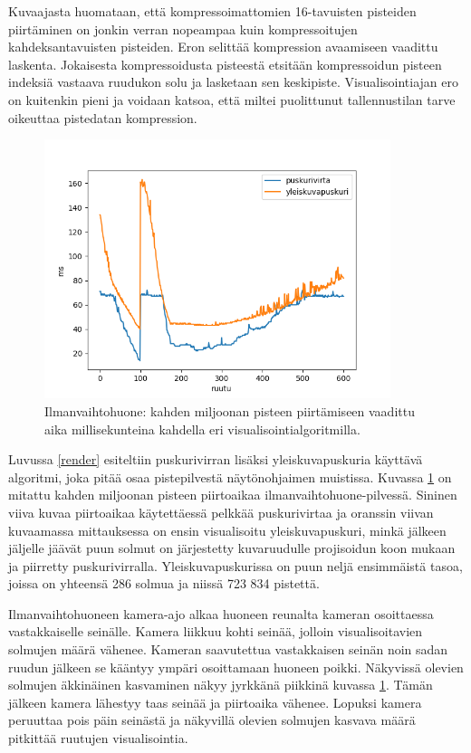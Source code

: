 Kuvaajasta huomataan, että kompressoimattomien 16-tavuisten pisteiden piirtäminen on jonkin verran nopeampaa kuin kompressoitujen kahdeksantavuisten pisteiden. Eron selittää kompression avaamiseen vaadittu laskenta. Jokaisesta kompressoidusta pisteestä etsitään kompressoidun pisteen indeksiä vastaava ruudukon solu ja lasketaan sen keskipiste. Visualisointiajan ero on kuitenkin pieni ja voidaan katsoa, että miltei puolittunut tallennustilan tarve oikeuttaa pistedatan kompression.

\begin{figure}[h] 
    \centering
    \includegraphics[width=0.9\textwidth]{tuloksia/ilmanvaihtohuone_ms_per_frame.png}
    \caption{Ilmanvaihtohuone: kahden miljoonan pisteen piirtämiseen vaadittu aika millisekunteina kahdella eri visualisointialgoritmilla.}
    \label{iv_ms}
\end{figure}

Luvussa \ref{render} esiteltiin puskurivirran lisäksi yleiskuvapuskuria käyttävä algoritmi, joka pitää osaa pistepilvestä näytönohjaimen muistissa. Kuvassa \ref{iv_ms} on mitattu kahden miljoonan pisteen piirtoaikaa ilmanvaihtohuone-pilvessä. Sininen viiva kuvaa piirtoaikaa käytettäessä pelkkää puskurivirtaa ja oranssin viivan kuvaamassa mittauksessa on ensin visualisoitu yleiskuvapuskuri, minkä jälkeen jäljelle jäävät puun solmut on järjestetty kuvaruudulle projisoidun koon mukaan ja piirretty puskurivirralla. Yleiskuvapuskurissa on puun neljä ensimmäistä tasoa, joissa on yhteensä 286 solmua ja niissä 723 834 pistettä.

Ilmanvaihtohuoneen kamera-ajo alkaa huoneen reunalta kameran osoittaessa vastakkaiselle seinälle. Kamera liikkuu kohti seinää, jolloin visualisoitavien solmujen määrä vähenee. Kameran saavutettua vastakkaisen seinän noin sadan ruudun jälkeen se kääntyy ympäri osoittamaan huoneen poikki. Näkyvissä olevien solmujen äkkinäinen kasvaminen näkyy jyrkkänä piikkinä kuvassa \ref{iv_ms}. Tämän jälkeen kamera lähestyy taas seinää ja piirtoaika vähenee. Lopuksi kamera peruuttaa pois päin seinästä ja näkyvillä olevien solmujen kasvava määrä pitkittää ruutujen visualisointia.

